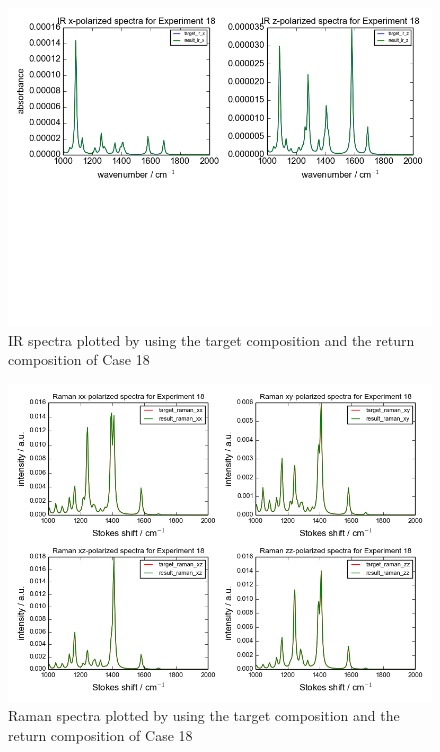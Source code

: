 \begin{figure}[!ht] 
\centering
\includegraphics[scale=0.7]{Figures/chapter4_result_target_plotting_500datapoint_ir.png}
\caption{IR spectra plotted by using the target composition and the return composition of Case 18} \label{fig:4.5}
\end{figure}

\begin{figure}[!ht] 
\centering
\includegraphics[scale=0.7]{Figures/chapter4_result_target_plotting_500datapoint_raman.png}
\caption{Raman spectra plotted by using the target composition and the return composition of Case 18} \label{fig:4.6}
\end{figure}

